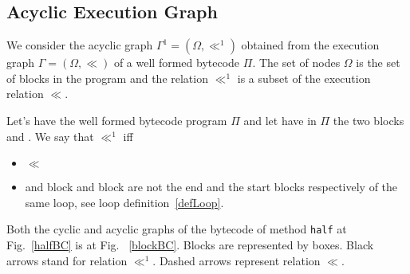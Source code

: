 


\subsection{Acyclic Execution Graph} \label{graph}
We consider the acyclic graph $\Gamma^1 = ( \Omega, \ll^1)$ obtained from the execution graph $\Gamma  = ( \Omega, \ll)$ of a well formed bytecode $ \Pi $. The set of nodes $\Omega$ is the set of  blocks in the program and the relation  $\ll^1 $ is a subset of the  execution relation $\ll$.
\begin{defn}
\label{acyclicExRel}
Let's have the well formed bytecode program $\Pi$ and let have in $\Pi$ the two blocks   and   . We say that  $\ll^{1}$  iff
\begin{itemize}
\item {} $\ll$ 
\item and block  and block  are not the end and the start blocks respectively of the same loop, see loop definition~\ref{defLoop}.
\end{itemize}
\end{defn}

Both the cyclic and acyclic graphs of the bytecode of method \texttt{half} at Fig.~\ref{halfBC} is at Fig. ~\ref{blockBC}. Blocks are represented by boxes. Black arrows stand for relation $\ll^1$. Dashed arrows represent relation $\ll$.

